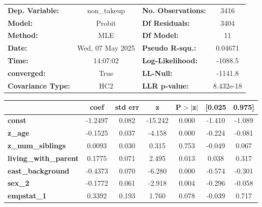\begin{center}
\begin{tabular}{lclc}
\toprule
\textbf{Dep. Variable:}       &   non\_takeup    & \textbf{  No. Observations:  } &     3416    \\
\textbf{Model:}               &      Probit      & \textbf{  Df Residuals:      } &     3404    \\
\textbf{Method:}              &       MLE        & \textbf{  Df Model:          } &       11    \\
\textbf{Date:}                & Wed, 07 May 2025 & \textbf{  Pseudo R-squ.:     } &  0.04671    \\
\textbf{Time:}                &     14:07:02     & \textbf{  Log-Likelihood:    } &   -1088.5   \\
\textbf{converged:}           &       True       & \textbf{  LL-Null:           } &   -1141.8   \\
\textbf{Covariance Type:}     &       HC2        & \textbf{  LLR p-value:       } & 8.432e-18   \\
\bottomrule
\end{tabular}
\begin{tabular}{lcccccc}
                              & \textbf{coef} & \textbf{std err} & \textbf{z} & \textbf{P$> |$z$|$} & \textbf{[0.025} & \textbf{0.975]}  \\
\midrule
\textbf{const}                &      -1.2497  &        0.082     &   -15.242  &         0.000        &       -1.410    &       -1.089     \\
\textbf{z\_age}               &      -0.1525  &        0.037     &    -4.158  &         0.000        &       -0.224    &       -0.081     \\
\textbf{z\_num\_siblings}     &       0.0093  &        0.030     &     0.315  &         0.753        &       -0.049    &        0.067     \\
\textbf{living\_with\_parent} &       0.1775  &        0.071     &     2.495  &         0.013        &        0.038    &        0.317     \\
\textbf{east\_background}     &      -0.4373  &        0.070     &    -6.280  &         0.000        &       -0.574    &       -0.301     \\
\textbf{sex\_2}               &      -0.1772  &        0.061     &    -2.918  &         0.004        &       -0.296    &       -0.058     \\
\textbf{empstat\_1}           &       0.3392  &        0.193     &     1.760  &         0.078        &       -0.039    &        0.717     \\

\end{tabular}
\end{center}
